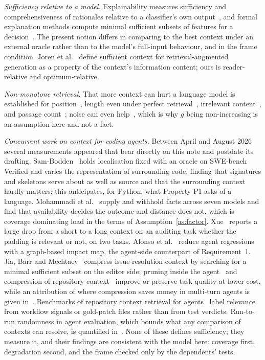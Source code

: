 \documentclass[10pt]{article}
\theoremstyle{definition}
\theoremstyle{plain}
\theoremstyle{remark}
\begin{document}
\emph{Sufficiency relative to a model.} Explainability measures sufficiency and comprehensiveness of rationales relative to a classifier's own output~\cite{deyoung2020eraser}, and formal explanation methods compute minimal sufficient subsets of features for a decision~\cite{ignatiev2019abduction,darwiche2020reasons}. The present notion differs in comparing to the best context under an external oracle rather than to the model's full-input behaviour, and in the frame condition. Joren et al.~\cite{joren2024sufficient} define sufficient context for retrieval-augmented generation as a property of the context's information content; ours is reader-relative and optimum-relative.

\emph{Non-monotone retrieval.} That more context can hurt a language model is established for position~\cite{liu2024lost}, length even under perfect retrieval~\cite{levy2024same,hsieh2024ruler,du2025length,rando2025longcodebench}, irrelevant content~\cite{shi2023distracted,yoran2023robust}, and passage count~\cite{jin2024longcontext}; noise can even help~\cite{cuconasu2024noise}, which is why $g$ being non-increasing is an assumption here and not a fact.

\emph{Concurrent work on context for coding agents.} Between April and August 2026 several measurements appeared that bear directly on this note and postdate its drafting. Sam-Bodden~\cite{sambodden2026context} holds localisation fixed with an oracle on SWE-bench Verified and varies the representation of surrounding code, finding that signatures and skeletons serve about as well as source and that the surrounding context hardly matters; this anticipates, for Python, what Property P1 asks of a language. Mohammadi et al.~\cite{mohammadi2026workingset} supply and withhold facts across seven models and find that availability decides the outcome and distance does not, which is coverage dominating load in the terms of Assumption~\ref{as:factor}. Xue~\cite{xue2026contextrot} reports a large drop from a short to a long context on an auditing task whether the padding is relevant or not, on two tasks. Alonso et al.~\cite{alonso2026tdad} reduce agent regressions with a graph-based impact map, the agent-side counterpart of Requirement~1. Jia, Barr and Mechtaev~\cite{jia2026compressing} compress issue-resolution context by searching for a minimal sufficient subset on the editor side; pruning inside the agent~\cite{wang2026swepruner} and compression of repository context~\cite{feng2026compression,zhang2024hcp} improve or preserve task quality at lower cost, while an attribution of where compression saves money in multi-turn agents is given in~\cite{chen2026gateways}. Benchmarks of repository context retrieval for agents~\cite{qin2026agentretrieval,li2026contextbench} label relevance from workflow signals or gold-patch files rather than from test verdicts. Run-to-run randomness in agent evaluation, which bounds what any comparison of contexts can resolve, is quantified in~\cite{bjarnason2026randomness}. None of these defines sufficiency; they measure it, and their findings are consistent with the model here: coverage first, degradation second, and the frame checked only by the dependents' tests.
\end{document}
